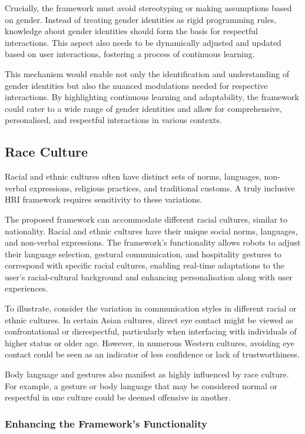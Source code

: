 Crucially, the framework must avoid stereotyping or making assumptions based on gender. Instead of treating gender identities as rigid programming rules, knowledge about gender identities should form the basis for respectful interactions. This aspect also needs to be dynamically adjusted and updated based on user interactions, fostering a process of continuous learning.

This mechanism would enable not only the identification and understanding of gender identities but also the nuanced modulations needed for respective interactions. By highlighting continuous learning and adaptability, the framework could cater to a wide range of gender identities and allow for comprehensive, personalised, and respectful interactions in various contexts.

\subsection{Race Culture}

Racial and ethnic cultures often have distinct sets of norms, languages, non-verbal expressions, religious practices, and traditional customs. A truly inclusive HRI framework requires sensitivity to these variations.

The proposed framework can accommodate different racial cultures, similar to nationality. Racial and ethnic cultures have their unique social norms, languages, and non-verbal expressions. The framework's functionality allows robots to adjust their language selection, gestural communication, and hospitality gestures to correspond with specific racial cultures, enabling real-time adaptations to the user's racial-cultural background and enhancing personalisation along with user experiences.

To illustrate, consider the variation in communication styles in different racial or ethnic cultures. In certain Asian cultures, direct eye contact might be viewed as confrontational or disrespectful, particularly when interfacing with individuals of higher status or older age. However, in numerous Western cultures, avoiding eye contact could be seen as an indicator of less confidence or lack of trustworthiness.

Body language and gestures also manifest as highly influenced by race culture. For example, a gesture or body language that may be considered normal or respectful in one culture could be deemed offensive in another.

\subsubsection{Enhancing the Framework's Functionality}

